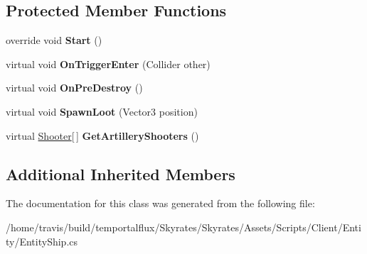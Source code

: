 \subsection*{Protected Member Functions}
\begin{DoxyCompactItemize}
\item 
\hypertarget{class_skyrates_1_1_common_1_1_entity_1_1_entity_ship_a6adfbce73ceafc8178a9a433c8f0f4ed}{override void {\bfseries Start} ()}\label{class_skyrates_1_1_common_1_1_entity_1_1_entity_ship_a6adfbce73ceafc8178a9a433c8f0f4ed}

\item 
\hypertarget{class_skyrates_1_1_common_1_1_entity_1_1_entity_ship_aa0550b01a86006271ca0e8b07623662a}{virtual void {\bfseries On\-Trigger\-Enter} (Collider other)}\label{class_skyrates_1_1_common_1_1_entity_1_1_entity_ship_aa0550b01a86006271ca0e8b07623662a}

\item 
\hypertarget{class_skyrates_1_1_common_1_1_entity_1_1_entity_ship_a62e661e1e1af2693016f780f09564d40}{virtual void {\bfseries On\-Pre\-Destroy} ()}\label{class_skyrates_1_1_common_1_1_entity_1_1_entity_ship_a62e661e1e1af2693016f780f09564d40}

\item 
\hypertarget{class_skyrates_1_1_common_1_1_entity_1_1_entity_ship_a68e5d44870b4d826e09fa1b8829a611b}{virtual void {\bfseries Spawn\-Loot} (Vector3 position)}\label{class_skyrates_1_1_common_1_1_entity_1_1_entity_ship_a68e5d44870b4d826e09fa1b8829a611b}

\item 
\hypertarget{class_skyrates_1_1_common_1_1_entity_1_1_entity_ship_afeda9b90389a25ca84e172a0865290d4}{virtual \hyperlink{class_shooter}{Shooter}\mbox{[}$\,$\mbox{]} {\bfseries Get\-Artillery\-Shooters} ()}\label{class_skyrates_1_1_common_1_1_entity_1_1_entity_ship_afeda9b90389a25ca84e172a0865290d4}

\end{DoxyCompactItemize}
\subsection*{Additional Inherited Members}


The documentation for this class was generated from the following file\-:\begin{DoxyCompactItemize}
\item 
/home/travis/build/temportalflux/\-Skyrates/\-Skyrates/\-Assets/\-Scripts/\-Client/\-Entity/Entity\-Ship.\-cs\end{DoxyCompactItemize}
